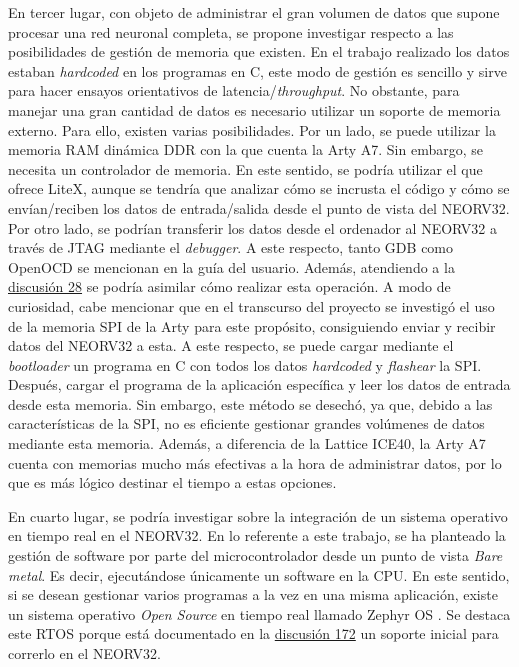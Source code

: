 En tercer lugar, con objeto de administrar el gran volumen de datos que supone procesar una red neuronal completa, se propone investigar respecto a las posibilidades de gestión de memoria que existen.
En el trabajo realizado los datos estaban \textit{hardcoded} en los programas en C, este modo de gestión es sencillo y sirve para hacer ensayos orientativos de latencia/\textit{throughput}.
No obstante, para manejar una gran cantidad de datos es necesario utilizar un soporte de memoria externo.
Para ello, existen varias posibilidades. 
Por un lado, se puede utilizar la memoria RAM dinámica DDR con la que cuenta la Arty A7.
Sin embargo, se necesita un controlador de memoria.
En este sentido, se podría utilizar el que ofrece LiteX, aunque se tendría que analizar cómo se incrusta el código y cómo se envían/reciben los datos de entrada/salida desde el punto de vista del NEORV32.
Por otro lado, se podrían transferir los datos desde el ordenador al NEORV32 a través de JTAG mediante el \textit{debugger}.
A este respecto, tanto GDB como OpenOCD se mencionan en la guía del usuario.
Además, atendiendo a la \href{https://github.com/stnolting/neorv32/discussions/28}{discusión 28} se podría asimilar cómo realizar esta operación.
A modo de curiosidad, cabe mencionar que en el transcurso del proyecto se investigó el uso de la memoria SPI de la Arty para este propósito, consiguiendo enviar y recibir datos del NEORV32 a esta.
A este respecto, se puede cargar mediante el \textit{bootloader} un programa en C con todos los datos \textit{hardcoded} y \textit{flashear} la SPI.
Después, cargar el programa de la aplicación específica y leer los datos de entrada desde esta memoria.
Sin embargo, este método se desechó, ya que, debido a las características de la SPI, no es eficiente gestionar grandes volúmenes de datos mediante esta memoria. 
Además, a diferencia de la Lattice ICE40, la Arty A7 cuenta con memorias mucho más efectivas a la hora de administrar datos, por lo que es más lógico destinar el tiempo a estas opciones.

En cuarto lugar, se podría investigar sobre la integración de un sistema operativo en tiempo real en el NEORV32. 
En lo referente a este trabajo, se ha planteado la gestión de software por parte del microcontrolador desde un punto de vista \textit{Bare metal}.
Es decir, ejecutándose únicamente un software en la CPU.
En este sentido, si se desean gestionar varios programas a la vez en una misma aplicación, existe un sistema operativo \textit{Open Source} en tiempo real llamado Zephyr OS \cite{zephyr}.
Se destaca este RTOS porque está documentado en la \href{https://github.com/stnolting/neorv32/discussions/172}{discusión 172} un soporte inicial para correrlo en el NEORV32.

